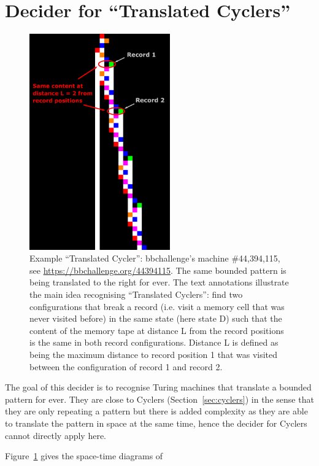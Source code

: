 \newpage
\section{Decider for ``Translated Cyclers''}\label{sec:translated-cyclers}

\begin{figure}[h!]
  \centering
  \includegraphics[width=0.54\textwidth]{space-time-diagrams/translated_cycler_44394115_annotated.pdf}

  \caption{Example ``Translated Cycler'': bbchallenge's machine \#44,394,115, see \url{https://bbchallenge.org/44394115}. The same bounded pattern is being translated to the right for ever. The text annotations illustrate the main idea recognising ``Translated Cyclers'': find two configurations that break a record (i.e. visit a memory cell that was never visited before) in the same state (here state \textcolor{colorD}{D}) such that the content of the memory tape at distance L from the record positions is the same in both record configurations. Distance L is defined as being the maximum distance to record position 1 that was visited between the configuration of record 1 and record 2.}\label{fig:translated-cyclers}
  \end{figure}
  
  The goal of this decider is to recognise Turing machines that translate a bounded pattern for ever. They are close to Cyclers (Section~\ref{sec:cyclers}) in the sense that they are only repeating a pattern but there is added complexity as they are able to translate the pattern in space at the same time, hence the decider for Cyclers cannot directly apply here.
  
  \begin{example}\normalfont
  Figure~\ref{fig:translated-cyclers} gives the space-time diagrams of 
  \end{example}
